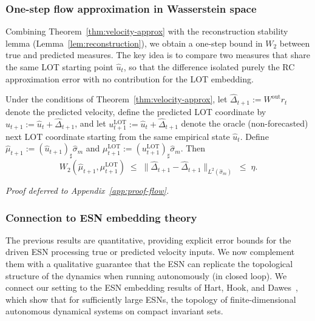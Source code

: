\documentclass[11pt]{article}
\newcommand{\1}{\mathbf{1}}
\begin{document}
\subsubsection{One-step flow approximation in Wasserstein space}
\label{sec:flow-approx}

Combining Theorem~\ref{thm:velocity-approx} with the reconstruction
stability lemma (Lemma~\ref{lem:reconstruction}), we obtain a one-step
bound in $W_2$ between true and predicted measures. The key idea is to compare two measures that share the same LOT starting point $\hat{u}_t$, so that the difference isolated purely the RC approximation error with no contribution for the LOT embedding.

\begin{corollary}\label{cor:flow}
Under the conditions of Theorem~\ref{thm:velocity-approx}, let
$\widehat{\Delta}_{t+1} := W^{\mathrm{out}} r_t$ denote the predicted
velocity, define the predicted LOT coordinate by
$\widehat{u}_{t+1} := \widehat{u}_t + \widehat{\Delta}_{t+1}$, and let
$u_{t+1}^{\mathrm{LOT}} := \hat{u}_t + \hat{\Delta}_{t+1}$
denote the oracle (non-forecasted) next LOT coordinate starting from the
same empirical state $\hat{u}_t$. Define
$\widehat{\mu}_{t+1} := (\widehat{u}_{t+1})_\sharp \hat{\sigma}_m$ and
$\mu_{t+1}^{\mathrm{LOT}} := (u_{t+1}^{\mathrm{LOT}})_\sharp \hat{\sigma}_m$.
Then
\begin{equation}\label{eq:flow-bound}
  W_2(\widehat{\mu}_{t+1}, \mu_{t+1}^{\mathrm{LOT}})
  \;\leq\;
  \|\widehat{\Delta}_{t+1} - \hat{\Delta}_{t+1}\|_{L^2(\hat{\sigma}_m)}
  \;\leq\; \eta.
\end{equation}
\end{corollary}
\noindent\emph{Proof deferred to Appendix~\ref{app:proof-flow}.}

\subsubsection{Connection to ESN embedding theory}
\label{sec:esn-embedding}

The previous results are quantitative, providing explicit error bounds
for the driven ESN processing true or predicted velocity inputs.  We now
complement them with a qualitative guarantee that the ESN can
replicate the topological structure of the dynamics when running
autonomously (in closed loop). We connect our setting to
the ESN embedding results of Hart, Hook, and Dawes~\cite{Hart_2020}, which
show that for sufficiently large ESNs, the topology of
finite-dimensional autonomous dynamical systems on compact invariant sets.
\end{document}
